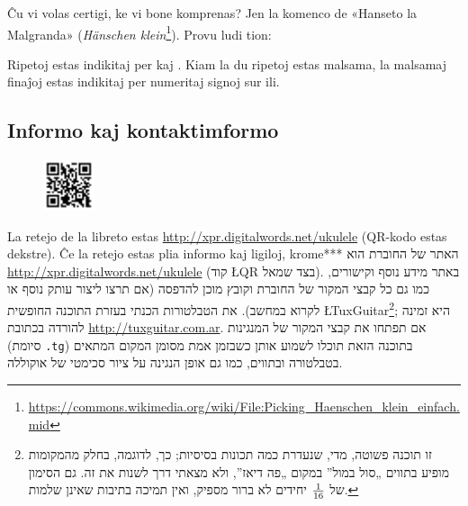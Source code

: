 Ĉu vi volas certigi, ke vi bone komprenas? Jen la komenco de «Hanseto la Malgranda» (\emph{Hänschen klein}\footnote{\url{https://commons.wikimedia.org/wiki/File:Picking_Haenschen_klein_einfach.mid}}). Provu ludi tion:

\begin{center}
\end{center}

Ripetoj estas indikitaj per  kaj . Kiam la du ripetoj estas malsama, la malsamaj finaĵoj estas indikitaj per numeritaj  signoj sur ili.



\subsection*{Informo kaj kontaktimformo}

\begin{figure}\vspace{-\baselineskip}\includegraphics[width=1.5cm]{../retejo.png}\end{figure}
	La retejo de la libreto estas \url{http://xpr.digitalwords.net/ukulele} (QR-kodo estas dekstre). Ĉe la retejo estas plia informo kaj ligiloj, krome***
האתר של החוברת הוא \url{http://xpr.digitalwords.net/ukulele} (קוד \L{QR} בצד שמאל). באתר מידע נוסף וקישורים, כמו גם כל קבצי המקור של החוברת וקובץ מוכן להדפסה (אם תרצו ליצור עותק נוסף או לקרוא במחשב). את הטבלטורות הכנתי בעזרת התוכנה החופשית \L{TuxGuitar}\footnote{זו תוכנה פשוטה, מדי, שנעדרת כמה תכונות בסיסיות; כך, לדוגמה, בחלק מהמקומות מופיע בתווים „סול במול” במקום „פה דיאז”, ולא מצאתי דרך לשנות את זה. גם הסימון של ${1}\over{16}$ יחידים לא ברור מספיק, ואין תמיכה בתיבות שאינן שלמות.}; היא זמינה להורדה בכתובת \url{http://tuxguitar.com.ar}. אם תפתחו את קבצי המקור של המנגינות (סיומת \texttt{.tg}) בתוכנה הזאת תוכלו לשמוע אותן כשבזמן אמת מסומן המקום המתאים בטבלטורה ובתווים, כמו גם אופן הנגינה על ציור סכימטי של אוקוללה.

